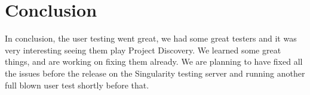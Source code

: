 \section{Conclusion}\label{sec:conclusion}
In conclusion, the user testing went great, we had some great testers and it was very interesting seeing them play Project Discovery. We learned some great things, and are working on fixing them already. We are planning to have fixed all the issues before the release on the Singularity testing server and running another full blown user test shortly before that.